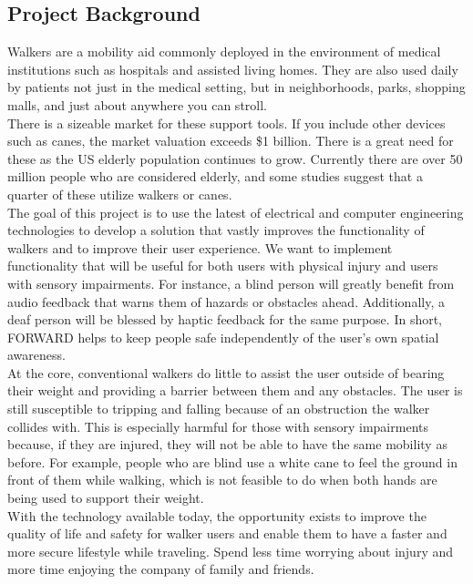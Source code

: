 \subsection{Project Background}
\indent Walkers are a mobility aid commonly deployed in the environment of medical institutions such as hospitals and assisted living homes. They are also used daily by patients not just in the medical setting, but in neighborhoods, parks, shopping malls, and just about anywhere you can stroll. \\

\noindent There is a sizeable market for these support tools. If you include other devices such as canes, the market valuation exceeds \$1 billion. There is a great need for these as the US elderly population continues to grow. Currently there are over 50 million people who are considered elderly, and some studies suggest that a quarter of these utilize walkers or canes. \\

\noindent The goal of this project is to use the latest of electrical and computer engineering technologies to develop a solution that vastly improves the functionality of walkers and to improve their user experience. We want to implement functionality that will be useful for both users with physical injury and users with sensory impairments. For instance, a blind person will greatly benefit from audio feedback that warns them of hazards or obstacles ahead. Additionally, a deaf person will be blessed by haptic feedback for the same purpose. In short, FORWARD helps to keep people safe independently of the user’s own spatial awareness. \\

\noindent At the core, conventional walkers do little to assist the user outside of bearing their weight and providing a barrier between them and any obstacles. The user is still susceptible to tripping and falling because of an obstruction the walker collides with. This is especially harmful for those with sensory impairments because, if they are injured, they will not be able to have the same mobility as before. For example, people who are blind use a white cane to feel the ground in front of them while walking, which is not feasible to do when both hands are being used to support their weight. \\

\noindent With the technology available today, the opportunity exists to improve the quality of life and safety for walker users and enable them to have a faster and more secure lifestyle while traveling. Spend less time worrying about injury and more time enjoying the company of family and friends. \\

